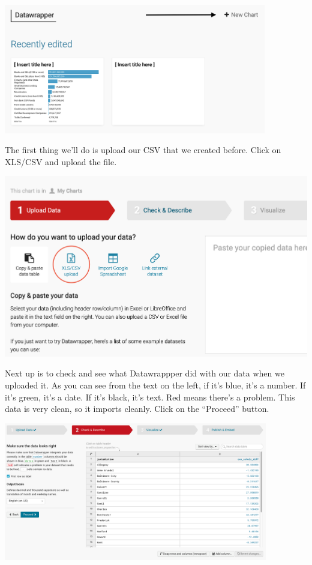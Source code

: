 \documentclass[
  letterpaper,
  DIV=11,
  numbers=noendperiod]{scrreprt}
\begin{document}
\includegraphics[width=4.51in,height=\textheight]{./images/ppp_datawrapper1.png}

The first thing we'll do is upload our CSV that we created before. Click
on XLS/CSV and upload the file.

\includegraphics[width=6.75in,height=\textheight]{./images/datawrapper2.png}

Next up is to check and see what Datawrappper did with our data when we
uploaded it. As you can see from the text on the left, if it's blue,
it's a number. If it's green, it's a date. If it's black, it's text. Red
means there's a problem. This data is very clean, so it imports cleanly.
Click on the ``Proceed'' button.

\includegraphics[width=4.53in,height=\textheight]{./images/datawrapper3.png}
\end{document}
